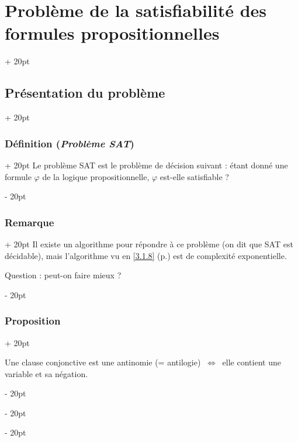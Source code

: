 \documentclass[a4paper, 12pt, twoside]{article}
\newcommand{\ssi}{\ \Leftrightarrow \ }
\newcommand{\ind}[1][20pt]{\advance\leftskip + #1}
\newcommand{\deind}[1][20pt]{\advance\leftskip - #1}
\newenvironment{indt}[2][20pt]{#2 \par \ind[#1]}{\par \deind} %
\begin{document}
    \vspace{12pt}
    
    \begin{indt}{\section{Problème de la satisfiabilité des formules propositionnelles}}
        
        \begin{indt}{\subsection{Présentation du problème}}
            \begin{indt}{\subsubsection{Définition (\textit{Problème SAT})}}
                Le problème SAT est le problème de décision suivant : étant donné une formule $\varphi$ de la logique propositionnelle, $\varphi$ est-elle satisfiable ?
            \end{indt}
            
            \vspace{12pt}
            
            \begin{indt}{\subsubsection{Remarque}}
                Il existe un algorithme pour répondre à ce problème (on dit que SAT est décidable), mais l'algorithme vu en \ref{3.1.8} (p.\pageref{3.1.8}) est de complexité exponentielle.
                
                Question : peut-on faire mieux ?
            \end{indt}
            
            \vspace{12pt}
            
            \begin{indt}{\subsubsection{Proposition}}
                \label{4.1.3}
                
                \begin{pseudocode}
                    Une clause conjonctive est une antinomie (= antilogie) $\ssi$ elle contient une variable et sa négation.
                \end{pseudocode}
                

\end{indt}
\end{indt}
\end{indt}
\end{document}
